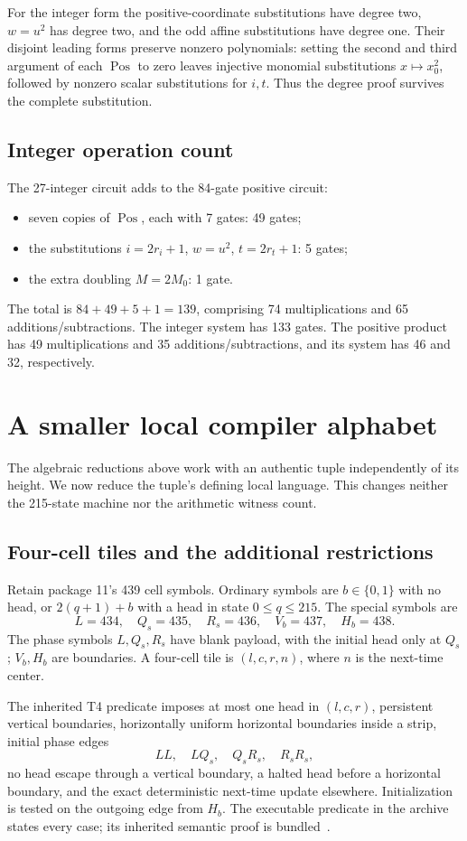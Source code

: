 \documentclass[11pt]{article}
\theoremstyle{definition}\newtheorem{definition}[theorem]{Definition}
\theoremstyle{remark}\newtheorem{remark}[theorem]{Remark}
\newcommand{\Pos}{\operatorname{Pos}}\newcommand{\Con}{\operatorname{Con}}
\begin{document}
For the integer form the positive-coordinate substitutions have degree two, $w=u^2$ has degree two, and the odd affine substitutions have degree one. Their disjoint leading forms preserve nonzero polynomials: setting the second and third argument of each $\Pos$ to zero leaves injective monomial substitutions $x\mapsto x_0^2$, followed by nonzero scalar substitutions for $i,t$. Thus the degree proof survives the complete substitution.

\subsection{Integer operation count}
The 27-integer circuit adds to the 84-gate positive circuit:
\begin{itemize}[nosep]
\item seven copies of $\Pos$, each with 7 gates: 49 gates;
\item the substitutions $i=2r_i+1$, $w=u^2$, $t=2r_t+1$: 5 gates;
\item the extra doubling $M=2M_0$: 1 gate.
\end{itemize}
The total is $84+49+5+1=139$, comprising 74 multiplications and 65 additions/subtractions. The integer system has 133 gates. The positive product has 49 multiplications and 35 additions/subtractions, and its system has 46 and 32, respectively.

\section{A smaller local compiler alphabet}
\label{sec:tiles}
The algebraic reductions above work with an authentic tuple independently of its height. We now reduce the tuple's defining local language. This changes neither the 215-state machine nor the arithmetic witness count.

\subsection{Four-cell tiles and the additional restrictions}
Retain package 11's 439 cell symbols. Ordinary symbols are $b\in\{0,1\}$ with no head, or $2(q+1)+b$ with a head in state $0\le q\le215$. The special symbols are
\[
L=434,\quad Q_s=435,\quad R_s=436,\quad V_b=437,\quad H_b=438.
\]
The phase symbols $L,Q_s,R_s$ have blank payload, with the initial head only at $Q_s$; $V_b,H_b$ are boundaries. A four-cell tile is $(l,c,r,n)$, where $n$ is the next-time center.

The inherited T4 predicate imposes at most one head in $(l,c,r)$, persistent vertical boundaries, horizontally uniform horizontal boundaries inside a strip, initial phase edges
\[
LL,\quad LQ_s,\quad Q_sR_s,\quad R_sR_s,
\]
no head escape through a vertical boundary, a halted head before a horizontal boundary, and the exact deterministic next-time update elsewhere. Initialization is tested on the outgoing edge from $H_b$. The executable predicate in the archive states every case; its inherited semantic proof is bundled~\cite{t4}.
\end{document}

